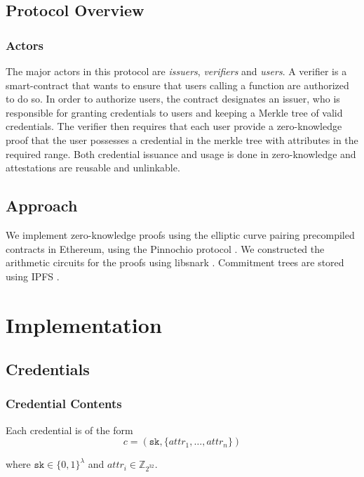 \documentclass[11 pt]{extarticle}
\newcommand{\Z}{\mathbb{Z}}
\theoremstyle{remark}
\begin{document}
\subsection{Protocol Overview}
\subsubsection{Actors}
The major actors in this protocol are \textit{issuers}, \textit{verifiers} and
\textit{users}. A verifier is a  smart-contract that wants to ensure that
users calling a function are authorized to do so. In order to authorize users,
the contract designates an issuer, who is responsible for granting credentials
to users and keeping a Merkle tree of valid credentials. The verifier then
requires that each user provide a zero-knowledge proof that the user possesses a
credential in the merkle tree with attributes in the required range. Both
credential issuance and usage is done in zero-knowledge and attestations are
reusable and unlinkable.

\subsection{Approach}
We implement zero-knowledge proofs using the elliptic curve pairing precompiled
contracts in Ethereum, using the Pinnochio protocol
\cite{parnoPinocchioNearlyPractical2013}. We constructed the arithmetic circuits
for the proofs using libsnark \cite{ben-sassonSNARKsVerifyingProgram2013}.
Commitment trees are stored using IPFS \cite{benetIPFSContentAddressed2014}.



\section{Implementation}

\subsection{Credentials}


\subsubsection{Credential Contents}
Each credential is of the form
\begin{equation*}
c =  ( \texttt{sk}, \{attr_1, \dots, attr_n\})
\end{equation*}

where $\texttt{sk} \in \{0, 1\}^\lambda$ and $attr_i \in \Z_{2^{32}}$.
\end{document}
